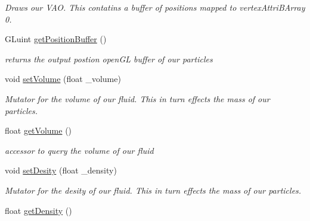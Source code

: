 \begin{DoxyCompactItemize}
\begin{DoxyCompactList}\small\item\em Draws our V\-A\-O. This contatins a buffer of positions mapped to vertex\-Attri\-B\-Array 0. \end{DoxyCompactList}\item 
\hypertarget{class_s_p_h_engine_aee51f7802e02c838732d9acab37da89a}{G\-Luint \hyperlink{class_s_p_h_engine_aee51f7802e02c838732d9acab37da89a}{get\-Position\-Buffer} ()}\label{class_s_p_h_engine_aee51f7802e02c838732d9acab37da89a}

\begin{DoxyCompactList}\small\item\em returns the output postion open\-G\-L buffer of our particles \end{DoxyCompactList}\item 
\hypertarget{class_s_p_h_engine_add241056dc1719b3a11486da48c3724c}{void \hyperlink{class_s_p_h_engine_add241056dc1719b3a11486da48c3724c}{set\-Volume} (float \-\_\-volume)}\label{class_s_p_h_engine_add241056dc1719b3a11486da48c3724c}

\begin{DoxyCompactList}\small\item\em Mutator for the volume of our fluid. This in turn effects the mass of our particles. \end{DoxyCompactList}\item 
\hypertarget{class_s_p_h_engine_a588d8e6f1276d07adb5363c8c3766fda}{float \hyperlink{class_s_p_h_engine_a588d8e6f1276d07adb5363c8c3766fda}{get\-Volume} ()}\label{class_s_p_h_engine_a588d8e6f1276d07adb5363c8c3766fda}

\begin{DoxyCompactList}\small\item\em accessor to query the volume of our fluid \end{DoxyCompactList}\item 
\hypertarget{class_s_p_h_engine_acbc638f7ab8fa2ab356dadf677df10c6}{void \hyperlink{class_s_p_h_engine_acbc638f7ab8fa2ab356dadf677df10c6}{set\-Desity} (float \-\_\-density)}\label{class_s_p_h_engine_acbc638f7ab8fa2ab356dadf677df10c6}

\begin{DoxyCompactList}\small\item\em Mutator for the desity of our fluid. This in turn effects the mass of our particles. \end{DoxyCompactList}\item 
\hypertarget{class_s_p_h_engine_a8ee29d26f9451d81a07abde5b1aa53c6}{float \hyperlink{class_s_p_h_engine_a8ee29d26f9451d81a07abde5b1aa53c6}{get\-Density} ()}\label{class_s_p_h_engine_a8ee29d26f9451d81a07abde5b1aa53c6}


\end{DoxyCompactItemize}
